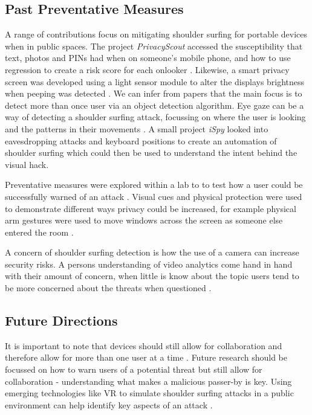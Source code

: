 \documentclass[12pt]{article}
\theoremstyle{plain}
\theoremstyle{definition}
\begin{document}
\subsection{Past Preventative Measures}
A range of contributions focus on mitigating shoulder surfing for portable devices when in public spaces. The project \textit{PrivacyScout} accessed the susceptibility that text, photos and PINs had when on someone's mobile phone, and how to use regression to create a risk score for each onlooker \cite{bace_privacyscout_2022}. Likewise, a smart privacy screen was developed using a light sensor module to alter the displays brightness when peeping was detected \cite{lian_smart_2013}. We can infer from papers that the main focus is to detect more than once user via an object detection algorithm. Eye gaze can be a way of detecting a shoulder surfing attack, focussing on where the user is looking and the patterns in their movements \cite{noauthor_just_nodate}. A small project \textit{iSpy} looked into eavesdropping attacks \cite{maggi_fast_2011} and keyboard positions to create an automation of shoulder surfing \cite{co-supervisor_ispy_nodate} which could then be used to understand the intent behind the visual hack.

Preventative measures were explored within a lab to to test how a user could be successfully warned of an attack \cite{brudy_is_2014}. Visual cues and physical protection were used to demonstrate different ways privacy could be increased, for example physical arm gestures were used to move windows across the screen as someone else entered the room \cite{brudy_is_2014}.

A concern of shoulder surfing detection is how the use of a camera can increase security risks. A persons understanding of video analytics come hand in hand with their amount of concern, when little is know about the topic users tend to be more concerned about the threats when questioned \cite{zhang_understanding_nodate}. 

\subsection{Future Directions}
It is important to note that devices should still allow for collaboration and therefore allow for more than one user at a time \cite{noauthor_pdf_nodate}. Future research should be focussed on how to warn users of a potential threat but still allow for collaboration - understanding what makes a malicious passer-by is key.  Using emerging technologies like VR to simulate shoulder surfing attacks in a public environment can help identify key aspects of an attack \cite{mathis_virtual_2022}.
\end{document}
